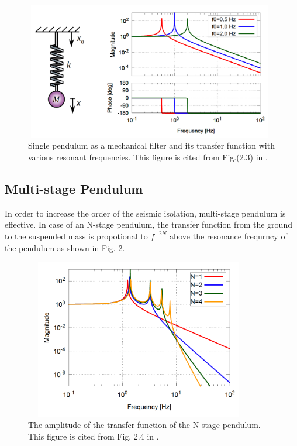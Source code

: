 \begin{figure}[h]
  \begin{center}   
    \includegraphics[width=11cm,height=6cm]{./img_chap5/img501.png}
    \caption{Single pendulum as a mechanical filter and its transfer function with various resonant frequencies. This figure is cited from Fig.(2.3) in \cite{sekiguchi2016astudy}.} \label{img:img501}
  \end{center}
\end{figure}

\subsection{Multi-stage Pendulum}
In order to increase the order of the seismic isolation, multi-stage pendulum is effective. In case of an N-stage pendulum, the transfer function from the ground to the suspended mass is propotional to $f^{-2N}$ above the resonance frequrncy of the pendulum as shown in Fig. \ref{img:img502}. 
\begin{figure}[h]
  \begin{center}   
    \includegraphics[width=10cm,height=7cm]{./img_chap5/img502.png}
    \caption{The amplitude of the transfer function of the N-stage pendulum. This figure is cited from Fig. 2.4 in \cite{sekiguchi2016astudy}.} \label{img:img502}
  \end{center}
\end{figure}


